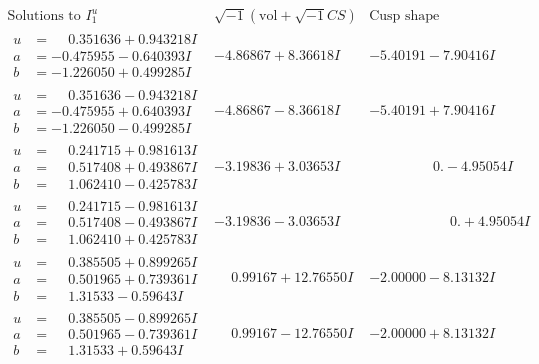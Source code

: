\documentclass[1p]{elsarticle_modified}
\theoremstyle{definition}
\newcommand{\I}{\sqrt{-1}}
\begin{document}
$$\begin{array}{c|c|c}  
\text{Solutions to }I^u_{1}& \I (\text{vol} + \sqrt{-1}CS) & \text{Cusp shape}\\
 \hline 
\begin{aligned}
u &= \phantom{-}0.351636 + 0.943218 I \\
a &= -0.475955 - 0.640393 I \\
b &= -1.226050 + 0.499285 I\end{aligned}
 & -4.86867 + 8.36618 I & -5.40191 - 7.90416 I \\ \hline\begin{aligned}
u &= \phantom{-}0.351636 - 0.943218 I \\
a &= -0.475955 + 0.640393 I \\
b &= -1.226050 - 0.499285 I\end{aligned}
 & -4.86867 - 8.36618 I & -5.40191 + 7.90416 I \\ \hline\begin{aligned}
u &= \phantom{-}0.241715 + 0.981613 I \\
a &= \phantom{-}0.517408 + 0.493867 I \\
b &= \phantom{-}1.062410 - 0.425783 I\end{aligned}
 & -3.19836 + 3.03653 I & \phantom{-0.000000 } 0. - 4.95054 I \\ \hline\begin{aligned}
u &= \phantom{-}0.241715 - 0.981613 I \\
a &= \phantom{-}0.517408 - 0.493867 I \\
b &= \phantom{-}1.062410 + 0.425783 I\end{aligned}
 & -3.19836 - 3.03653 I & \phantom{-0.000000 -}0. + 4.95054 I \\ \hline\begin{aligned}
u &= \phantom{-}0.385505 + 0.899265 I \\
a &= \phantom{-}0.501965 + 0.739361 I \\
b &= \phantom{-}1.31533 - 0.59643 I\end{aligned}
 & \phantom{-}0.99167 + 12.76550 I & -2.00000 - 8.13132 I \\ \hline\begin{aligned}
u &= \phantom{-}0.385505 - 0.899265 I \\
a &= \phantom{-}0.501965 - 0.739361 I \\
b &= \phantom{-}1.31533 + 0.59643 I\end{aligned}
 & \phantom{-}0.99167 - 12.76550 I & -2.00000 + 8.13132 I \\ \hline\begin{aligned}

\end{aligned}
\end{array}$$
\end{document}
